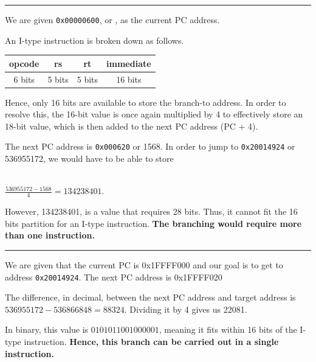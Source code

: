 \documentclass[11pt]{exam}
\newcommand{\cc}[1]{\texttt{#1}}
\newcounter{questionCounter}
\newcounter{partCounter}[questionCounter]
\newenvironment{namedquestion}[1]{%
    \addtocounter{questionCounter}{1}%
    \setcounter{partCounter}{0}%
    \vspace{.2in}%
        \noindent{\bf #1}%
    \vspace{0.3em} \hrule \vspace{.1in}%
}{}
\begin{document}
\begin{namedquestion}{Question 2.41}
We are given \cc{0x00000600}, or \cc{}, as the current PC address.

An I-type instruction is broken down as follows.

\begingroup
    \medskip
    \centering
    \def\arraystretch{1.5}
        \begin{tabular}{cccc}
            \toprule
            opcode & rs & rt & immediate\\
            \midrule
            6 bits & 5 bits & 5 bits & 16 bits\\
            \bottomrule
        \end{tabular}
    \label{fig:c2table2}
    \medskip
\endgroup

Hence, only 16 bits are available to store the branch-to address. In order to resolve this, the 16-bit value is once again multiplied by 4 to effectively store an 18-bit value, which is then added to the next PC address (PC + 4). 

The next PC address is \cc{0x000620} or 1568. In order to jump to \cc{0x20014924} or 536955172, we would have to be able to store 

\\$\frac{536955172-1568}{4} = 134238401$.

However, 134238401, is a value that requires 28 bits. Thus, it cannot fit the 16 bits partition for an I-type instruction. \textbf{The branching would require more than one instruction.} 

\end{namedquestion}

\begin{namedquestion}{Question 2.42}
We are given that the current PC is 0x1FFFF000 and our goal is to get to address \cc{0x20014924}. The next PC address is 0x1FFFF020

The difference, in decimal, between the next PC address and target address is $536955172-536866848 = 88324$. Dividing it by 4 gives us 22081. 

In binary, this value is $0101 0110 0100 0001$, meaning it fits within 16 bits of the I-type instruction. \textbf{Hence, this branch can be carried out in a single instruction.}
\end{namedquestion}

\printbibliography
\end{document}
